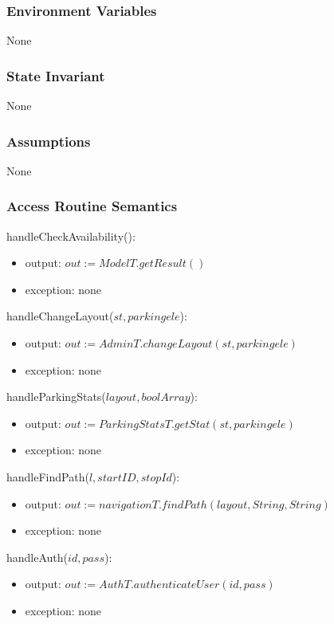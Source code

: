 \documentclass[12pt, titlepage]{article}
\begin{document}
\subsubsection{Environment Variables}
None

\subsubsection{State Invariant}
None

\subsubsection{Assumptions}
None

\subsubsection{Access Routine Semantics}

\noindent handleCheckAvailability():
\begin{itemize}
    \item output: $out := ModelT.getResult()$
    \item exception: none
\end{itemize}

\noindent handleChangeLayout($st, parkingele$):
\begin{itemize}
    \item output: $out := AdminT.changeLayout(st, parkingele)$
    \item exception: none
\end{itemize}


\noindent handleParkingStats($layout, boolArray$):
\begin{itemize}
    \item output: $out := ParkingStatsT.getStat(st, parkingele)$
    \item exception: none
\end{itemize}



\noindent handleFindPath($l, startID, stopId$):
\begin{itemize}
    \item output: $out := navigationT.findPath(layout, String, String)$
    \item exception: none
\end{itemize}

\noindent handleAuth($id, pass$):
\begin{itemize}
    \item output: $out := AuthT.authenticateUser(id,pass)$
    \item exception: none
\end{itemize}
\end{document}
